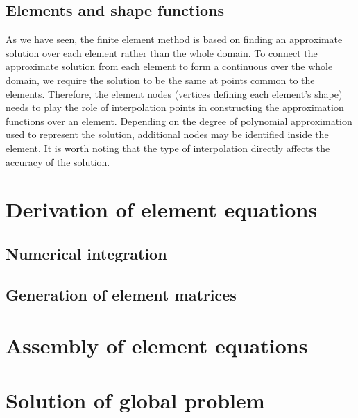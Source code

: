 	\subsection{Elements and shape functions}
As we have seen, the finite element method is based on finding an approximate solution over each element rather than the whole domain. To connect the approximate solution from each element to form a continuous over the whole domain, we require the solution to be the same at points common to the elements. Therefore, the element nodes (vertices defining each element's shape) needs to play the role of interpolation points in constructing the approximation functions over an element. Depending on the degree of polynomial approximation used to represent the solution, additional nodes may be identified inside the element. It is worth noting that the type of interpolation directly affects the accuracy of the solution. 

	
	
\section{Derivation of element equations}	
	\subsection{Numerical integration}
	\subsection{Generation of element matrices}

\section{Assembly of element equations}

\section{Solution of global problem}
		



